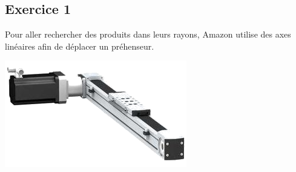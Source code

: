 \documentclass[10pt,fleqn]{article} %
\begin{document}

\vspace{5.5cm}
\pagestyle{fancy}
\thispagestyle{plain}


\def\columnseprulecolor{\color{ocre}}
\setlength{\columnseprule}{0.4pt} 

\begin{multicols}{2}
%
%
%
%


\section*{Exercice 1}

Pour aller rechercher des produits dans leurs rayons, Amazon utilise des axes linéaires afin de déplacer un préhenseur.
\begin{center}
\includegraphics[width=\linewidth]{images/fig_11}
\end{center}


\end{multicols}
\end{document}
